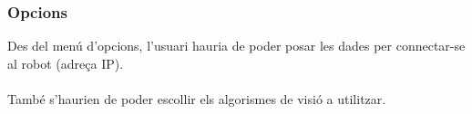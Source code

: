 	\subsubsection{Opcions}
		Des del menú d'opcions, l'usuari hauria de poder posar les dades per connectar-se al robot (adreça IP).\\\\
		També s'haurien de poder escollir els algorismes de visió a utilitzar.
		
